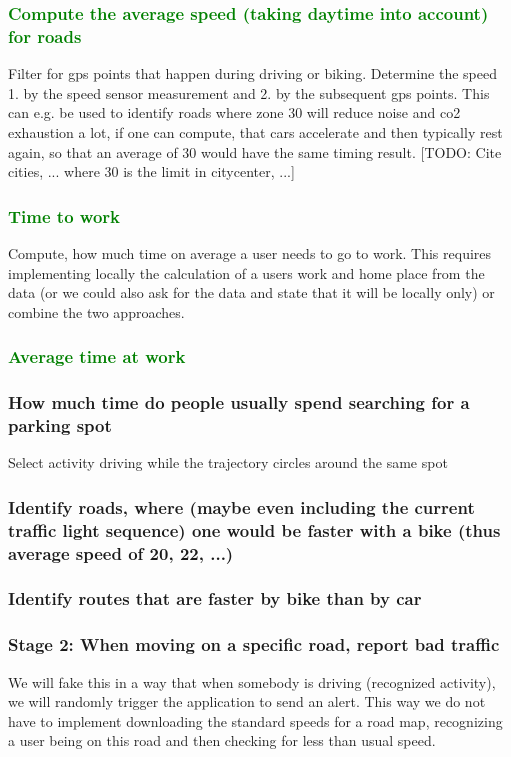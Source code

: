 \subsubsection{\textcolor{green}{Compute the average speed (taking daytime into account) for roads}}
Filter for gps points that happen during driving or biking. Determine the speed 1. by the speed sensor measurement and 2. by the subsequent gps points.
This can e.g. be used to identify roads where zone 30 will reduce noise and co2 exhaustion a lot, if one can compute, that cars accelerate and then typically rest again, so that an average of 30 would have the same timing result. [TODO: Cite cities, ... where 30 is the limit in citycenter, ...]

\subsubsection{\textcolor{green}{Time to work}}
Compute, how much time on average a user needs to go to work.
This requires implementing locally the calculation of a users work and home place from the data (or we could also ask for the data and state that it will be locally only) or combine the two approaches.

\subsubsection{\textcolor{green}{Average time at work}}

\subsubsection{How much time do people usually spend searching for a parking spot}
Select activity driving while the trajectory circles around the same spot
\subsubsection{Identify roads, where (maybe even including the current traffic light sequence) one would be faster with a bike (thus average speed of 20, 22, ...)}
\subsubsection{Identify routes that are faster by bike than by car}



\subsubsection{Stage 2: When moving on a specific road, report bad traffic}
We will fake this in a way that when somebody is driving (recognized activity), we will randomly trigger the application to send an alert.
This way we do not have to implement downloading the standard speeds for a road map, recognizing a user being on this road and then checking for less than usual speed.

